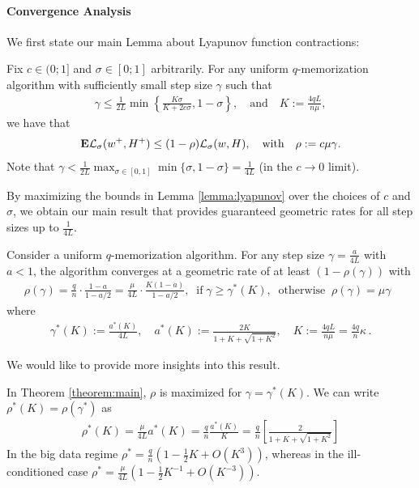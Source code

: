 \paragraph*{Convergence Analysis}


We first state our main Lemma about Lyapunov function contractions:
\begin{lemma}
\label{lemma:lyapunov}
Fix $c \in (0;1]$ and $\sigma \in [0;1]$ arbitrarily. For any uniform $q$-memorization algorithm with sufficiently small step size $\gamma$ such that
\begin{align}
\gamma \le \frac{1}{2L} \min \left\{\frac{K\sigma }{K + 2c\sigma}, 1-\sigma \right\}, \quad 
\text{and} \quad K:=  \frac{4qL}{n \mu},
\label{eq:gamma-admissible}
\end{align}
we have that 
\begin{align}
{\mathbf E} {\mathcal L}_\sigma(w^+,H^+)  \le (1-\rho) {\mathcal L}_\sigma(w,H),\quad \text{with} \quad \rho := c \mu \gamma.
\end{align}
Note that $\gamma < \frac 1{2L} \max_{\sigma \in [0,1]} \min\{ \sigma ,  1-\sigma\} = \frac{1}{4L}$ (in the $c \to 0$ limit).
\end{lemma}
%
By maximizing the bounds in Lemma \ref{lemma:lyapunov} over the choices of $c$ and $\sigma$, we obtain our main result that provides guaranteed geometric rates for all step sizes up to $\frac 1 {4L}$. 
\begin{theorem}
\label{theorem:main}
Consider  a uniform $q$-memorization algorithm. For any step size $\gamma = \frac a {4L}$ with $a<1$, the algorithm converges at a geometric rate of at least $(1-\rho(\gamma))$ with 
\begin{align}
\rho(\gamma) = \frac{q}{n} \cdot \frac{1 - a}{1-a/2} 
= \frac{\mu}{4L} \cdot \frac{K (1 - a)}{1-a/2}, \;\;  \text{if} \;\gamma \geq \gamma^*(K), \;\; 
\text{otherwise} \;\; \rho(\gamma) = \mu \gamma   \;\; 
\end{align}
where 
\begin{align}
\gamma^*(K) :=  \frac {a^*(K)} {4 L}, \quad 
a^*(K) := \frac{2K}{1+K + \sqrt{1+K^2}},
%
\quad K:=  \frac{4qL}{n \mu} = \frac{4q}{n} \kappa \, .
\label{eq:gammalk}
\end{align}
\end{theorem}
We would like to provide more insights into this result. 
\begin{corollary}
\label{corollary:opt-rho}
In Theorem \ref{theorem:main}, $\rho$ is maximized for $\gamma = \gamma^*(K)$. We can write $\rho^*(K) = \rho(\gamma^*)$ as 
\begin{align}
\rho^*(K) = 
\frac \mu {4L} a^*(K) %
= \frac{q}{n}\frac{a^*(K)}{K} = \frac qn \left[ \frac{2}{1+K + \sqrt{1 + K^2} } \right]
\end{align}
In the big data regime $\rho^* = \frac qn (1-\frac 12 K + O(K^3))$, whereas in the ill-conditioned case $\rho^* = \frac \mu{4L} (1 - \frac {1}{2}K^{-1} + O(K^{-3}))$.
\end{corollary}
